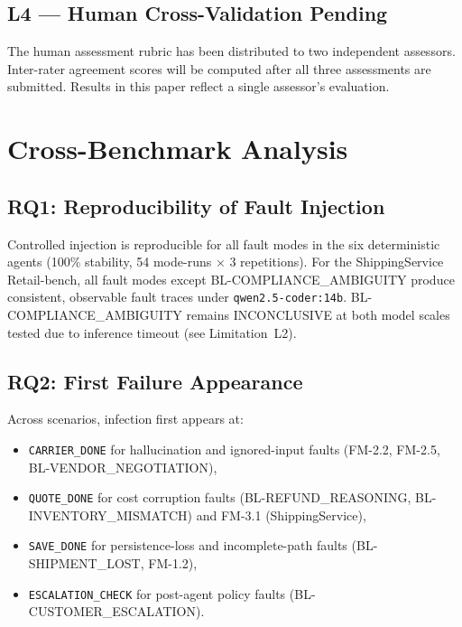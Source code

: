\documentclass[conference]{IEEEtran}
\begin{document}
\subsection{L4 --- Human Cross-Validation Pending}

The human assessment rubric has been distributed to two independent assessors.
Inter-rater agreement scores will be computed after all three assessments are
submitted. Results in this paper reflect a single assessor's evaluation.

\section{Cross-Benchmark Analysis}

\subsection{RQ1: Reproducibility of Fault Injection}
Controlled injection is reproducible for all fault modes in the six deterministic
agents (100\% stability, 54 mode-runs $\times$ 3 repetitions). For the
ShippingService Retail-bench, all fault modes except BL-COMPLIANCE\_AMBIGUITY
produce consistent, observable fault traces under \texttt{qwen2.5-coder:14b}.
BL-COMPLIANCE\_AMBIGUITY remains INCONCLUSIVE at both model scales tested due
to inference timeout (see Limitation~L2).

\subsection{RQ2: First Failure Appearance}
Across scenarios, infection first appears at:
\begin{itemize}
  \item \texttt{CARRIER\_DONE} for hallucination and ignored-input faults
        (FM-2.2, FM-2.5, BL-VENDOR\_NEGOTIATION),
  \item \texttt{QUOTE\_DONE} for cost corruption faults
        (BL-REFUND\_REASONING, BL-INVENTORY\_MISMATCH) and FM-3.1 (ShippingService),
  \item \texttt{SAVE\_DONE} for persistence-loss and incomplete-path faults
        (BL-SHIPMENT\_LOST, FM-1.2),
  \item \texttt{ESCALATION\_CHECK} for post-agent policy faults
        (BL-CUSTOMER\_ESCALATION).
\end{itemize}
\end{document}
